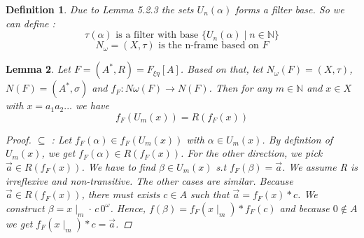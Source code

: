 \documentclass[12pt, a4paper]{scrartcl}
\newtheorem{definition}{Definition}[subsection]
\newtheorem{lemma}[definition]{Lemma}
\begin{document}
\begin{definition}
    Due to Lemma 5.2.3 the sets $U_n(\alpha)$ forms a filter base. So we can define :
    $$\tau(\alpha) \mbox{ is a filter with base } \{U_n(\alpha) \mid n \in \mathbb{N} \}$$
    $$N_\omega = (X, \tau) \mbox{ is the n-frame based on } F$$

\end{definition}

\begin{lemma}
    Let $F = (A^*, R) = F_{\xi \eta}[A]$. Based on that, let $N_\omega(F) = (X,\tau)$, $N(F) = (A^*, \sigma)$ and $f_F : N\omega(F) \rightarrow N(F)$.
    Then for any $m \in \mathbb{N}$ and $x\in X$ with $x = a_1a_2...$ \newline we have $$f_F(U_m(x)) = R(f_F(x))$$
    \vspace{0.01cm}
    \begin{proof}
            $\subseteq$ : Let $f_F(\alpha) \in f_F(U_m(x))$ with $\alpha \in U_m(x)$. By defintion of $U_m(x)$,
            we get $f_F(\alpha) \in R(f_F(x))$. \newline \newline
            For the other direction, we pick $\vec{a} \in R(f_F(x))$. We have to find $\beta \in U_m(x)$ s.t $f_F(\beta) = \vec{a}$. We assume R is irreflexive and non-transitive.
            The other cases are similar. \newline
            Because $\vec{a} \in R(f_F(x))$, there must exists $c \in A$ such that $ \vec{a} = f_F(x) * c $.
            We construct $\beta = x \mid_m \cdot \, c\, 0^\omega$. Hence, $f(\beta) = f_F(x \mid_m) * f_F(c)$ and because $ 0 \notin A$ we get $f_F(x \mid_m) * c = \vec{a}$.
            
            
    \end{proof}
\end{lemma}
\end{document}
